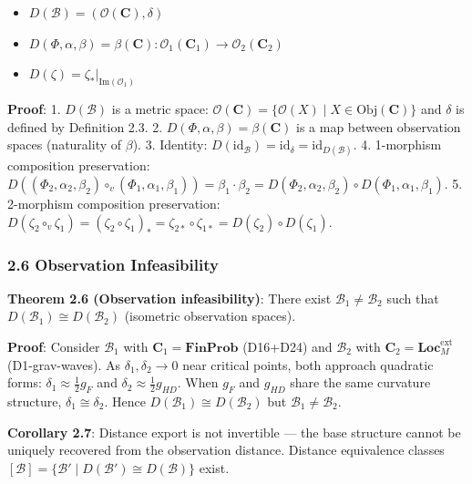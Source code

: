 \documentclass[
]{article}
\providecommand{\tightlist}{%
  \setlength{\itemsep}{0pt}\setlength{\parskip}{0pt}}
\begin{document}
\begin{itemize}
\tightlist
\item
  \(D(\mathcal{B}) = (\mathcal{O}(\mathbf{C}), \delta)\)
\item
  \(D(\Phi, \alpha, \beta) = \beta(\mathbf{C}): \mathcal{O}_1(\mathbf{C}_1) \to \mathcal{O}_2(\mathbf{C}_2)\)
\item
  \(D(\zeta) = \zeta_*|_{\text{Im}(\mathcal{O}_1)}\)
\end{itemize}

\textbf{Proof}: 1. \(D(\mathcal{B})\) is a metric space:
\(\mathcal{O}(\mathbf{C}) = \{\mathcal{O}(X) \mid X \in \text{Obj}(\mathbf{C})\}\)
and \(\delta\) is defined by Definition 2.3. 2.
\(D(\Phi, \alpha, \beta) = \beta(\mathbf{C})\) is a map between
observation spaces (naturality of \(\beta\)). 3. Identity:
\(D(\text{id}_{\mathcal{B}}) = \text{id}_{\delta} = \text{id}_{D(\mathcal{B})}\).
4. 1-morphism composition preservation:
\(D((\Phi_2, \alpha_2, \beta_2) \circ_v (\Phi_1, \alpha_1, \beta_1)) = \beta_1 \cdot \beta_2 = D(\Phi_2, \alpha_2, \beta_2) \circ D(\Phi_1, \alpha_1, \beta_1)\).
5. 2-morphism composition preservation:
\(D(\zeta_2 \circ_v \zeta_1) = (\zeta_2 \circ \zeta_1)_* = \zeta_{2*} \circ \zeta_{1*} = D(\zeta_2) \circ D(\zeta_1)\).

\subsubsection{2.6 Observation
Infeasibility}\label{observation-infeasibility}

\textbf{Theorem 2.6 (Observation infeasibility)}: There exist
\(\mathcal{B}_1 \neq \mathcal{B}_2\) such that
\(D(\mathcal{B}_1) \cong D(\mathcal{B}_2)\) (isometric observation
spaces).

\textbf{Proof}: Consider \(\mathcal{B}_1\) with
\(\mathbf{C}_1 = \mathbf{FinProb}\) (D16+D24) and \(\mathcal{B}_2\) with
\(\mathbf{C}_2 = \mathbf{Loc}_M^{\text{ext}}\) (D1-grav-waves). As
\(\delta_1, \delta_2 \to 0\) near critical points, both approach
quadratic forms: \(\delta_1 \approx \frac{1}{2} g_F\) and
\(\delta_2 \approx \frac{1}{2} g_{HD}\). When \(g_F\) and \(g_{HD}\)
share the same curvature structure, \(\delta_1 \cong \delta_2\). Hence
\(D(\mathcal{B}_1) \cong D(\mathcal{B}_2)\) but
\(\mathcal{B}_1 \neq \mathcal{B}_2\).

\textbf{Corollary 2.7}: Distance export is not invertible --- the base
structure cannot be uniquely recovered from the observation distance.
Distance equivalence classes
\([\mathcal{B}] = \{\mathcal{B}' \mid D(\mathcal{B}') \cong D(\mathcal{B})\}\)
exist.
\end{document}
